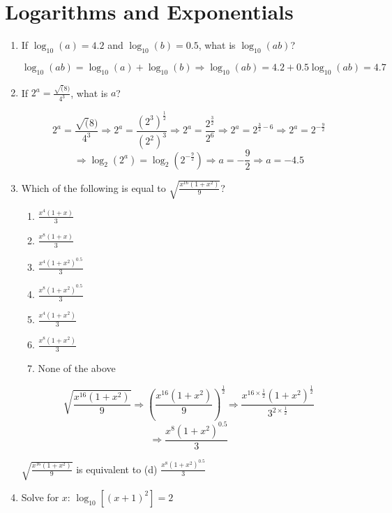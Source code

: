 \documentclass{article}
\begin{document}
\section{Logarithms and Exponentials}
\begin{enumerate}
\item If $\log_{10}(a) = 4.2$ and $\log_{10}(b) = 0.5$, what is $\log_{10}(ab)$?

\[\log_{10}(ab) = \log_{10}(a) + \log_{10}(b) \Longrightarrow \log_{10}(ab) = 4.2 + 0.5
    \log_{10}(ab) = 4.7\]

\item If $2^{a} = \frac{\sqrt(8)}{4^{3}}$, what is $a$?

\[2^{a} = \frac{\sqrt(8)}{4^{3}}
    \Longrightarrow 2^{a} = \frac{{\left(2^{3}\right)}^{\frac{1}{2}}}{{\left(2^{2}\right)}^{3}}
    \Longrightarrow 2^{a} = \frac{2^{\frac{3}{2}}}{2^{6}}
    \Longrightarrow 2^{a} = 2^{\frac{3}{2}-6}
    \Longrightarrow 2^{a} = 2^{-\frac{9}{2}}\]
\[\Longrightarrow \log_{2}\left(2^{a}\right) = \log_{2}\left(2^{-\frac{9}{2}}\right)
    \Longrightarrow a = -\frac{9}{2} \Longrightarrow a = -4.5\]

\item Which of the following is equal to $\sqrt{\frac{x^{16}(1 + x^{2})}{9}}$?

    \begin{enumerate}
        \item $\frac{x^{4}(1 + x)}{3}$
        \item $\frac{x^{8}(1 + x)}{3}$
        \item $\frac{x^{4}{(1 + x^{2})}^{0.5}}{3}$
        \item $\frac{x^{8}{(1 + x^{2})}^{0.5}}{3}$
        \item $\frac{x^{4}(1 + x^{2})}{3}$
        \item $\frac{x^{8}(1 + x^{2})}{3}$
        \item None of the above
    \end{enumerate}

\[\sqrt{\frac{x^{16}(1 + x^{2})}{9}} \Longrightarrow {\left(\frac{x^{16}(1 + x^{2})}{9}\right)}^{\frac{1}{2}}
    \Longrightarrow \frac{x^{16\times\frac{1}{2}}{(1 + x^{2})}^{\frac{1}{2}}}{3^{2\times\frac{1}{2}}}\]
\[\Longrightarrow \frac{x^{8}{(1 + x^{2})}^{0.5}}{3}\]

$\sqrt{\frac{x^{16}{(1 + x^{2})}}{9}}$ is equivalent to (d) $\frac{x^{8}{(1 + x^{2})}^{0.5}}{3}$

\item Solve for $x$: $\log_{10}\left[{(x + 1)}^{2}\right]=2$


\end{enumerate}
\end{document}
